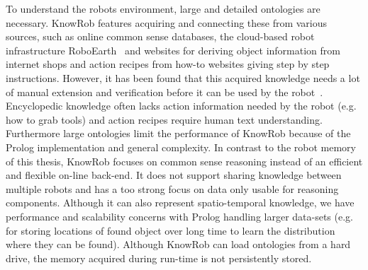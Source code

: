 To understand the robots environment, large and detailed ontologies
are necessary. KnowRob features acquiring and connecting these from
various sources, such as online common sense databases, the
cloud-based robot infrastructure RoboEarth~\cite{roboearth} and
websites for deriving object information from internet shops and
action recipes from how-to websites giving step by step instructions.
However, it has been found that this acquired knowledge needs a lot of
manual extension and verification before it can be used by the
robot~\cite{KnowRob-Web}. Encyclopedic knowledge often lacks action
information needed by the robot (e.g. how to grab tools) and
action recipes require human text understanding.
Furthermore large ontologies limit the performance of KnowRob because
of the Prolog implementation and general complexity. In contrast to
the robot memory of this thesis, KnowRob focuses on common
sense reasoning instead of an efficient and flexible on-line
back-end. It does not support sharing knowledge between multiple
robots and has a too strong focus on data only usable for reasoning
components. Although it can also represent spatio-temporal knowledge,
we have performance and scalability concerns with Prolog handling
larger data-sets (e.g. for storing locations of found object over long
time to learn the distribution where they can be found). Although
KnowRob can load ontologies from a hard drive, the memory acquired
during run-time is not persistently stored.

